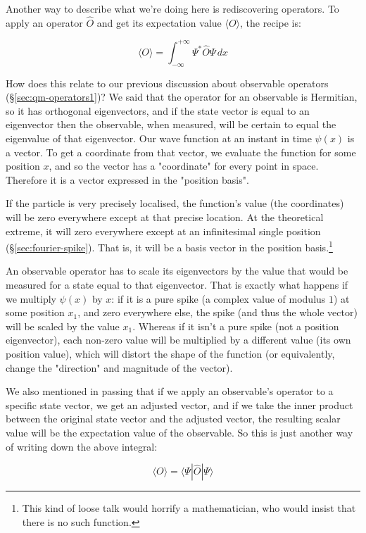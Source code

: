 Another way to describe what we're doing here is rediscovering operators. To apply an operator $\hat{O}$ and get its expectation value $\langle O \rangle$, the recipe is:

$$
\langle O \rangle =
\int_{-\infty}^{+\infty}
\Psi^*
\hat{O}
\Psi
\,dx
$$

How does this relate to our previous discussion about observable operators (§\ref{sec:qm-operators1})? We said that the operator for an observable is Hermitian, so it has orthogonal eigenvectors, and if the state vector is equal to an eigenvector then the observable, when measured, will be certain to equal the eigenvalue of that eigenvector. Our wave function at an instant in time $\psi(x)$ is a vector. To get a coordinate from that vector, we evaluate the function for some position $x$, and so the vector has a "coordinate" for every point in space. Therefore it is a vector expressed in the "position basis".

If the particle is very precisely localised, the function's value (the coordinates) will be zero everywhere except at that precise location. At the theoretical extreme, it will zero everywhere except at an infinitesimal single position (§\ref{sec:fourier-spike}). That is, it will be a basis vector in the position basis.\footnote{This kind of loose talk would horrify a mathematician, who would insist that there is no such function.}

An observable operator has to scale its eigenvectors by the value that would be measured for a state equal to that eigenvector. That is exactly what happens if we multiply $\psi(x)$ by $x$: if it is a pure spike (a complex value of modulus $1$) at some position $x_1$, and zero everywhere else, the spike (and thus the whole vector) will be scaled by the value $x_1$. Whereas if it isn't a pure spike (not a position eigenvector), each non-zero value will be multiplied by a different value (its own position value), which will distort the shape of the function (or equivalently, change the "direction" and magnitude of the vector).

We also mentioned in passing that if we apply an observable's operator to a specific state vector, we get an adjusted vector, and if we take the inner product between the original state vector and the adjusted vector, the resulting scalar value will be the expectation value of the observable. So this is just another way of writing down the above integral:

$$
\langle O \rangle =
\langle \Psi| \hat{O} | \Psi \rangle
$$

